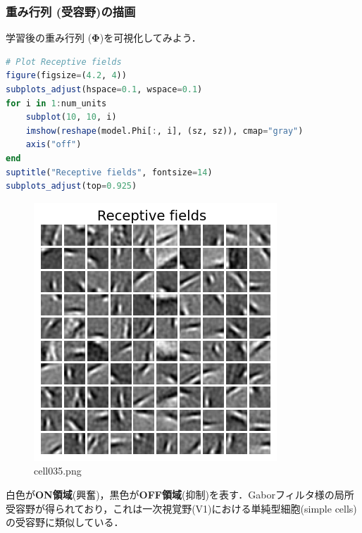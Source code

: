 \subsubsection{重み行列 (受容野)の描画}
学習後の重み行列  ($\mathbf{\Phi}$)を可視化してみよう．
\begin{lstlisting}[language=julia]
# Plot Receptive fields
figure(figsize=(4.2, 4))
subplots_adjust(hspace=0.1, wspace=0.1)
for i in 1:num_units
    subplot(10, 10, i)
    imshow(reshape(model.Phi[:, i], (sz, sz)), cmap="gray")
    axis("off")
end
suptitle("Receptive fields", fontsize=14)
subplots_adjust(top=0.925)
\end{lstlisting}
\begin{figure}[ht]
	\centering
	\includegraphics[scale=0.8, max width=\linewidth]{./fig/energy-based-model/sparse-coding/cell035.png}
	\caption{cell035.png}
	\label{cell035.png}
\end{figure}
白色が\textbf{ON領域}(興奮)，黒色が\textbf{OFF領域}(抑制)を表す．Gaborフィルタ様の局所受容野が得られており，これは一次視覚野(V1)における単純型細胞(simple cells)の受容野に類似している．
